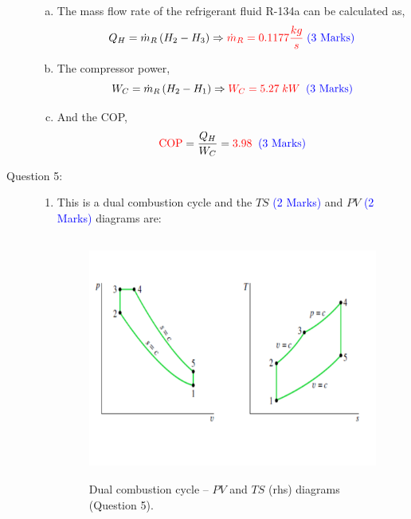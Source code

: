 \documentclass[12pt,twoside]{report}
\newcommand{\frc}{\displaystyle\frac}
\begin{document}
\begin{description}
\begin{enumerate}[(a)]
%
\item The mass flow rate of the refrigerant fluid R-134a can be calculated as,
\begin{displaymath}
Q_{H}=\dot{m}_{R}\left(H_{2}-H_{3}\right)\Rightarrow \textcolor{red}{\dot{m}_{R}=0.1177\frc{kg}{s}}\;\textcolor{blue}{\text{(3 Marks)}}
\end{displaymath}

%
\item The compressor power,
\begin{displaymath}
W_{C}=\dot{m}_{R}\left(H_{2}-H_{1}\right)\Rightarrow \textcolor{red}{W_{C}=5.27\;kW}\;\;\textcolor{blue}{\text{(3 Marks)}}
\end{displaymath}

%
\item And the COP,
\begin{displaymath}
\textcolor{red}{\text{COP}} = \frc{Q_{H}}{W_{C}}=\textcolor{red}{3.98}\;\;\textcolor{blue}{\text{(3 Marks)}}
\end{displaymath}

\end{enumerate}



\clearpage

\item [Question 5:] 


\begin{enumerate}

\item This is a dual combustion cycle and the $TS$ \textcolor{blue}{(2 Marks)} and $PV$ \textcolor{blue}{(2 Marks)} diagrams are:
\begin{figure}[h]
\begin{center}
\includegraphics[width=12.0cm,height=8.0cm]{./Pics/InternalCombustion_IdealDualCombustion}
\end{center}
\caption{Dual combustion cycle -- $PV$ and $TS$ (rhs) diagrams (Question 5).}
\end{figure}



\end{enumerate}
\end{description}
\end{document}
